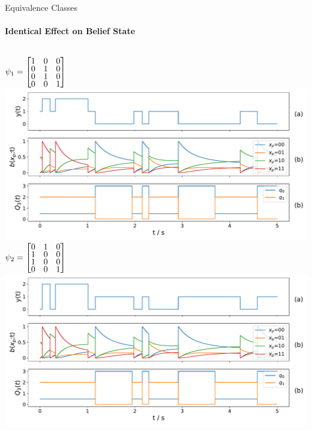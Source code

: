 \documentclass[
english,%
aspectratio=169,%
color={accentcolor=3b},
logo=true,%
colorframetitle=false,%
]{tudabeamer}
\begin{document}
\begin{frame}{Equivalence Classes}
\framesubtitle{Identical Effect on Belief State}
	\begin{columns}
	$ \psi_1 = 
	\begin{bmatrix} \vspace{-3pt}
	1 & 0 & 0 \\  \vspace{-3pt}
	0 & 1 & 0 \\  \vspace{-3pt}
	0 & 1 & 0 \\  \vspace{-2pt}
	0 & 0 & 1
	\end{bmatrix} $\\
	\includegraphics[height=0.5\textheight]{figures/same_belief/psi_0}
	$ \psi_{2} =
	\begin{bmatrix}\vspace{-3pt}
		0 & 1 & 0 \\\vspace{-3pt}
		1 & 0 & 0 \\\vspace{-3pt}
		1 & 0 & 0 \\\vspace{-2pt}
		0 & 0 & 1
	\end{bmatrix} $\\
	\includegraphics[height=0.5\textheight]{figures/same_belief/psi_29}
	\end{columns}
\end{frame}
\end{document}

